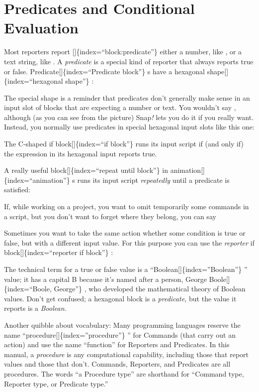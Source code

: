 \documentclass[
  letterpaper,
]{book}
\begin{document}
\section{Predicates and Conditional
Evaluation}\label{predicates-and-conditional-evaluation}

Most reporters report {[}{]}\{index=``block:predicate''\} either a
number, like , or a text string, like . A \emph{predicate} is a special
kind of reporter that always reports true or false.
Predicate{[}{]}\{index=``Predicate block''\} s have a hexagonal
shape{[}{]}\{index=``hexagonal shape''\} :

The special shape is a reminder that predicates don't generally make
sense in an input slot of blocks that are expecting a number or text.
You wouldn't say , although (as you can see from the picture)
Snap\emph{!} lets you do it if you really want. Instead, you normally
use predicates in special hexagonal input slots like this one:

The C-shaped if block{[}{]}\{index=``if block''\} runs its input script
if (and only if) the expression in its hexagonal input reports true.

A really useful block{[}{]}\{index=``repeat until block''\} in
animation{[}{]}\{index=``animation''\} s runs its input script
\emph{repeatedly} until a predicate is satisfied:

If, while working on a project, you want to omit temporarily some
commands in a script, but you don't want to forget where they belong,
you can say

Sometimes you want to take the same action whether some condition is
true or false, but with a different input value. For this purpose you
can use the \emph{reporter} if block{[}{]}\{index=``reporter if
block''\} :

The technical term for a true or false value is a
``Boolean{[}{]}\{index=''Boolean''\} '' value; it has a capital B
because it's named after a person, George Boole{[}{]}\{index=``Boole,
George''\} , who developed the mathematical theory of Boolean values.
Don't get confused; a hexagonal block is a \emph{predicate,} but the
value it reports is a \emph{Boolean.}

Another quibble about vocabulary: Many programming languages reserve the
name ``procedure{[}{]}\{index=''procedure''\} '' for Commands (that
carry out an action) and use the name ``function'' for Reporters and
Predicates. In this manual, a \emph{procedure} is any computational
capability, including those that report values and those that don't.
Commands, Reporters, and Predicates are all procedures. The words ``a
Procedure type'' are shorthand for ``Command type, Reporter type, or
Predicate type.''
\end{document}
